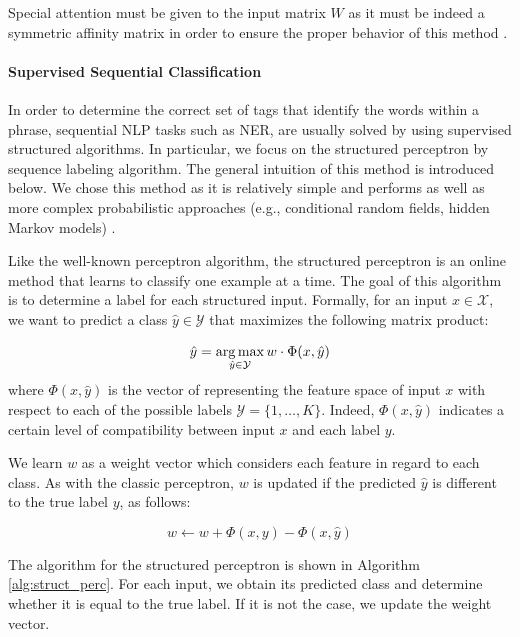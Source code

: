 Special attention must be given to the input matrix $W$ as it must be indeed a symmetric affinity matrix in order to ensure the proper behavior of this method \cite{Luxburg2007,GoyalH14}.



\paragraph{Supervised Sequential Classification}\label{sec:perceptron} 

In order to determine the correct set of tags that identify the words within a phrase, sequential NLP tasks such as NER, are usually solved by using supervised structured algorithms. In particular, we focus on the  structured perceptron  by \cite{Collins2002} sequence labeling algorithm. The general intuition of this method is introduced below. We chose this method as it is relatively simple and performs as well as more complex probabilistic approaches (e.g., conditional random fields, hidden Markov models)  \cite{Daume2006,daume2012course}. 


Like  the well-known perceptron algorithm, the structured perceptron is an online method that learns to classify one example at a time. The goal of this algorithm is to determine a label for each structured input. Formally, for an input $x \in \mathcal{X}$, we want to predict a class $\hat{y} \in \mathcal{Y}$ that maximizes the following matrix product: 

\begin{equation}
\hat{y}= \argmax_{\hat{y}\in \mathcal{Y}}w\cdot \Phi(x,\hat{y})
\end{equation}
where $\Phi(x,\hat{y})$ is the vector of representing  the feature space of input  $x$ with respect to each of the  possible labels $\mathcal{Y}=\{1,\dots,\textit{K}\}$. Indeed,  $\Phi(x,\hat{y})$ indicates a certain level of compatibility between input $x$ and each label $y$. 

We learn $w$ as a weight vector which considers each feature in regard to each class. As with the classic perceptron, $w$ is updated if the predicted $\hat{y}$ is different to the true label $y$, as follows: 

\begin{equation}
w \leftarrow w+\Phi(x,y) - \Phi(x,\hat{y})
\end{equation}

The algorithm for the structured perceptron is shown in Algorithm \ref{alg:struct_perc}.  For each input, we obtain its predicted class and determine whether it is equal to the true label. If it is not the case, we update the weight vector.

